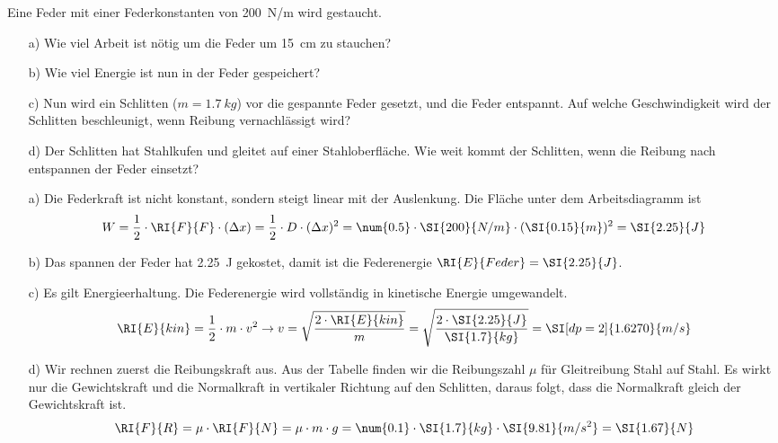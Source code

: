 
\begin{aufgabe}
	Eine Feder mit einer Federkonstanten von \SI{200}{N/m} wird gestaucht.
	\begin{itemize}
		\item [a)] Wie viel Arbeit ist nötig um die Feder um \SI{15}{cm} zu stauchen?
		\item [b)] Wie viel Energie ist nun in der Feder gespeichert?
		\item [c)] Nun wird ein Schlitten ($m=\SI{1.7}{kg}$) vor die gespannte Feder gesetzt, und die Feder entspannt.
			Auf welche Geschwindigkeit wird der Schlitten beschleunigt, wenn Reibung vernachlässigt wird?
		\item [d)] Der Schlitten hat Stahlkufen und gleitet auf einer Stahloberfläche. Wie weit kommt der Schlitten, wenn
			die Reibung nach entspannen der Feder einsetzt?
	\end{itemize}
	\begin{loesung}
		\begin{itemize}
			\item [a)] Die Federkraft ist nicht konstant, sondern steigt linear mit der Auslenkung.
				Die Fläche unter dem Arbeitsdiagramm ist 
				\begin{eqnarray*}
				W=\frac{1}{2}\cdot\RI{F}{F}\cdot(\Delta x)=\frac{1}{2}\cdot D\cdot (\Delta x)^2=\num{0.5}\cdot\SI{200}{N/m}\cdot(\SI{0.15}{m})^2=\SI{2.25}{J}
				\end{eqnarray*}
			\item[b)] Das spannen der Feder hat \SI{2.25}{J} gekostet, damit ist die Federenergie $\RI{E}{Feder}=\SI{2.25}{J}$.
			\item[c)] Es gilt Energieerhaltung. Die Federenergie wird vollständig in kinetische Energie umgewandelt.
				\begin{eqnarray*}
					\RI{E}{kin}=\frac{1}{2}\cdot m\cdot v^2 \to v=\sqrt{\frac{2\cdot \RI{E}{kin}}{m}} =\sqrt{\frac{2\cdot\SI{2.25}{J}}{\SI{1.7}{kg}}}=\SI[dp=2]{1.6270}{m/s}
				\end{eqnarray*}
			\item[d)] Wir rechnen zuerst die Reibungskraft aus. Aus der Tabelle finden wir die Reibungszahl $\mu$ für Gleitreibung Stahl auf Stahl.
				Es wirkt nur die Gewichtskraft und die Normalkraft in vertikaler Richtung auf den Schlitten, 
				daraus folgt, dass die Normalkraft gleich
				der Gewichtskraft ist.
				\begin{eqnarray*}
					\RI{F}{R}=\mu\cdot\RI{F}{N}=\mu\cdot m\cdot g=\num{0.1}\cdot\SI{1.7}{kg}\cdot\SI{9.81}{m/s^2}=\SI{1.67}{N}
				\end{eqnarray*}

\end{itemize}
\end{loesung}
\end{aufgabe}
